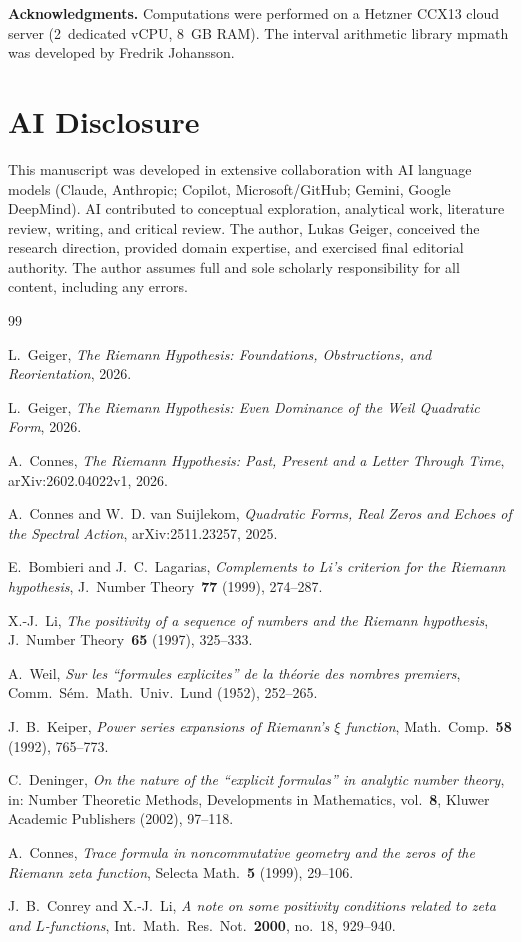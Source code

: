 \documentclass[12pt,a4paper]{article}
\theoremstyle{definition}
\theoremstyle{remark}
\begin{document}
\bigskip
\noindent\textbf{Acknowledgments.} Computations were performed on a Hetzner CCX13 cloud server (2~dedicated vCPU, 8~GB RAM). The interval arithmetic library mpmath was developed by Fredrik Johansson.


\section*{AI Disclosure}

This manuscript was developed in extensive collaboration with AI language models (Claude, Anthropic; Copilot, Microsoft/GitHub; Gemini, Google DeepMind). AI contributed to conceptual exploration, analytical work, literature review, writing, and critical review. The author, Lukas Geiger, conceived the research direction, provided domain expertise, and exercised final editorial authority. The author assumes full and sole scholarly responsibility for all content, including any errors.


\begin{thebibliography}{99}

L.~Geiger, \emph{The Riemann Hypothesis: Foundations, Obstructions, and Reorientation}, 2026.

L.~Geiger, \emph{The Riemann Hypothesis: Even Dominance of the Weil Quadratic Form}, 2026.

A.~Connes, \emph{The Riemann Hypothesis: Past, Present and a Letter Through Time}, arXiv:2602.04022v1, 2026.

A.~Connes and W.~D. van Suijlekom, \emph{Quadratic Forms, Real Zeros and Echoes of the Spectral Action}, arXiv:2511.23257, 2025.

E.~Bombieri and J.~C.~Lagarias, \emph{Complements to Li's criterion for the Riemann hypothesis}, J.~Number Theory~\textbf{77} (1999), 274--287.

X.-J.~Li, \emph{The positivity of a sequence of numbers and the Riemann hypothesis}, J.~Number Theory~\textbf{65} (1997), 325--333.

A.~Weil, \emph{Sur les ``formules explicites'' de la th\'eorie des nombres premiers}, Comm.~S\'em.~Math.~Univ.~Lund (1952), 252--265.

J.~B.~Keiper, \emph{Power series expansions of Riemann's $\xi$ function}, Math.~Comp.~\textbf{58} (1992), 765--773.

C.~Deninger, \emph{On the nature of the ``explicit formulas'' in analytic number theory}, in: Number Theoretic Methods, Developments in Mathematics, vol.~\textbf{8}, Kluwer Academic Publishers (2002), 97--118.

A.~Connes, \emph{Trace formula in noncommutative geometry and the zeros of the Riemann zeta function}, Selecta Math.~\textbf{5} (1999), 29--106.

J.~B.~Conrey and X.-J.~Li, \emph{A note on some positivity conditions related to zeta and $L$-functions}, Int.~Math.~Res.~Not.~\textbf{2000}, no.~18, 929--940.

\end{thebibliography}
\end{document}
